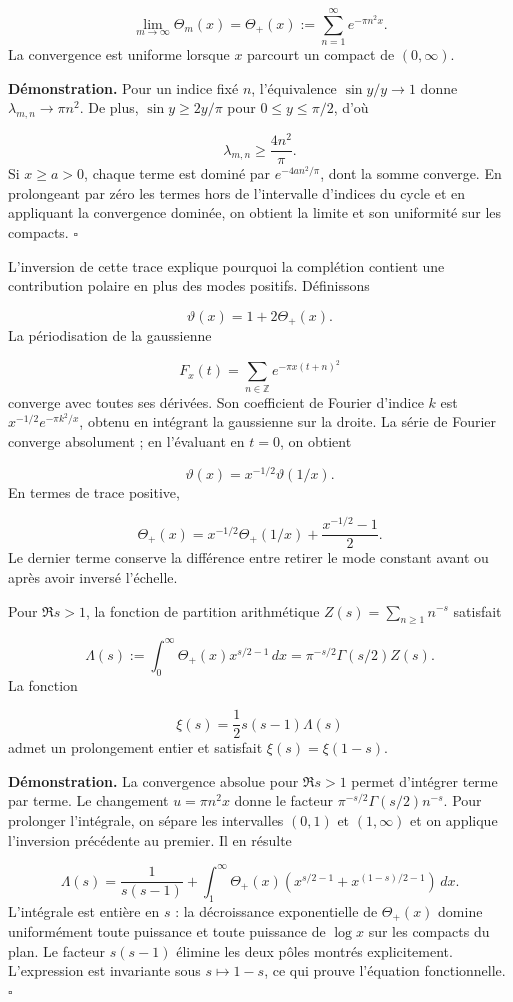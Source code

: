 \[
\lim_{m\to\infty}\Theta_m(x)
=\Theta_+(x):=\sum_{n=1}^{\infty}e^{-\pi n^2x}.
\]
La convergence est uniforme lorsque \(x\) parcourt un compact de \((0,\infty)\).

\textbf{Démonstration.} Pour un indice fixé \(n\), l'équivalence \(\sin y/y\to1\) donne \(\lambda_{m,n}\to\pi n^2\). De plus, \(\sin y\geq2y/\pi\) pour \(0\leq y\leq\pi/2\), d'où

\[
\lambda_{m,n}\geq\frac{4n^2}{\pi}.
\]
Si \(x\geq a>0\), chaque terme est dominé par \(e^{-4an^2/\pi}\), dont la somme converge. En prolongeant par zéro les termes hors de l’intervalle d’indices du cycle et en appliquant la convergence dominée, on obtient la limite et son uniformité sur les compacts. \hfill\(\square\)

L'inversion de cette trace explique pourquoi la complétion contient une contribution polaire en plus des modes positifs. Définissons

\[
\vartheta(x)=1+2\Theta_+(x).
\]
La périodisation de la gaussienne

\[
F_x(t)=\sum_{n\in\mathbb Z}e^{-\pi x(t+n)^2}
\]
converge avec toutes ses dérivées. Son coefficient de Fourier d'indice \(k\) est \(x^{-1/2}e^{-\pi k^2/x}\), obtenu en intégrant la gaussienne sur la droite. La série de Fourier converge absolument ; en l'évaluant en \(t=0\), on obtient

\[
\vartheta(x)=x^{-1/2}\vartheta(1/x).
\]
En termes de trace positive,

\[
\Theta_+(x)=x^{-1/2}\Theta_+(1/x)+\frac{x^{-1/2}-1}{2}.
\]
Le dernier terme conserve la différence entre retirer le mode constant avant ou après avoir inversé l’échelle.

Pour \(\Re s>1\), la fonction de partition arithmétique \(Z(s)=\sum_{n\geq1}n^{-s}\) satisfait

\[
\Lambda(s):=\int_0^\infty\Theta_+(x)x^{s/2-1}\,dx
=\pi^{-s/2}\Gamma(s/2)Z(s).
\]
La fonction

\[
\xi(s)=\frac12s(s-1)\Lambda(s)
\]
admet un prolongement entier et satisfait \(\xi(s)=\xi(1-s)\).

\textbf{Démonstration.} La convergence absolue pour \(\Re s>1\) permet d'intégrer terme par terme. Le changement \(u=\pi n^2x\) donne le facteur \(\pi^{-s/2}\Gamma(s/2)n^{-s}\). Pour prolonger l'intégrale, on sépare les intervalles \((0,1)\) et \((1,\infty)\) et on applique l'inversion précédente au premier. Il en résulte

\[
\Lambda(s)=\frac1{s(s-1)}
+\int_1^\infty\Theta_+(x)
\left(x^{s/2-1}+x^{(1-s)/2-1}\right)\,dx.
\]
L’intégrale est entière en \(s\) : la décroissance exponentielle de \(\Theta_+(x)\) domine uniformément toute puissance et toute puissance de \(\log x\) sur les compacts du plan. Le facteur \(s(s-1)\) élimine les deux pôles montrés explicitement. L’expression est invariante sous \(s\mapsto1-s\), ce qui prouve l’équation fonctionnelle. \hfill\(\square\)

